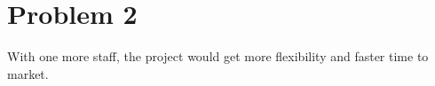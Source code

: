 \chapter{Problem 2}
\label{chp:two}


With one more staff, the project would get more flexibility and faster time to market. 